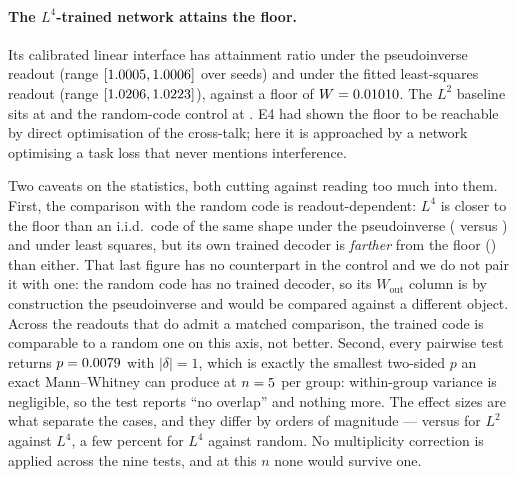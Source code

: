 \documentclass[preprint,12pt]{elsarticle}
\theoremstyle{definition}
\begin{document}
\paragraph{The $L^4$-trained network attains the floor.} Its calibrated linear interface has
attainment ratio \EfiveLfourRatioPinvMean{} under the pseudoinverse readout (range
$[1.0005,1.0006]$ over \EfiveSeeds{} seeds) and
\EfiveLfourRatioLsMean{} under the fitted least-squares readout (range
$[1.0206,1.0223]$), against a floor of $W=0.01010$. The
$L^2$ baseline sits at \EfiveLtwoRatioLsMean{} and the random-code control at
\EfiveRandRatioLsMean. E4 had shown the floor to be reachable by direct optimisation of the
cross-talk; here it is approached by a network optimising a task loss that never mentions
interference.

Two caveats on the statistics, both cutting against reading too much into them. First, the
comparison with the random code is readout-dependent: $L^4$ is closer to the floor than an
i.i.d.\ code of the same shape under the pseudoinverse (\EfiveLfourRatioPinvMean{} versus
\EfiveRandRatioPinvMean) and under least squares, but its own trained decoder is
\emph{farther} from the floor (\EfiveLfourRatioWoutMean) than either. That last figure has no
counterpart in the control and we do not pair it with one: the random code has no trained
decoder, so its $W_{\mathrm{out}}$ column is by construction the pseudoinverse and would be
compared against a different object. Across the readouts that do admit a matched comparison,
the trained code is comparable to a random one on this axis, not better. Second, every pairwise test returns
$p=0.0079$ with $|\delta|=1$, which is exactly the smallest two-sided $p$ an exact
Mann--Whitney can produce at $n=5$ per group: within-group variance is negligible, so
the test reports ``no overlap'' and nothing more. The effect sizes are what separate the cases,
and they differ by orders of magnitude --- \EfiveLtwoRatioLsMean{} versus
\EfiveLfourRatioLsMean{} for $L^2$ against $L^4$, a few percent for $L^4$ against random. No
multiplicity correction is applied across the nine tests, and at this $n$ none would survive
one.
\end{document}
